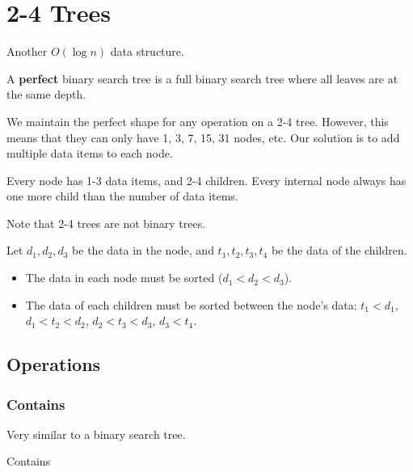 
\section{2-4 Trees}

Another \( O(\log n) \) data structure.
\begin{definition}
	A \textbf{perfect} binary search tree is a full binary search tree where all leaves are at the same depth.
\end{definition}

We maintain the perfect shape for any operation on a 2-4 tree. However, this means that they can only have 1, 3, 7, 15, 31 nodes, etc. Our solution is to add multiple data items to each node.

\begin{property}
	Every node has 1-3 data items, and 2-4 children. Every internal node always has one more child than the number of data items.
\end{property}

\begin{note}
	Note that 2-4 trees are not binary trees.
\end{note}

\begin{property}
	Let \( d_{1}, d_{2}, d_{3} \) be the data in the node, and \( t_{1}, t_{2}, t_{3}, t_{4} \) be the data of the children.
	\begin{itemize}
		\item The data in each node must be sorted (\( d_{1} < d_{2} < d_{3} \)).
		\item The data of each children must be sorted between the node's data: \( t_{1} < d_{1} \), \( d_{1} < t_{2} < d_{2} \), \( d_{2} < t_{3} < d_{3} \), \( d_{3} < t_{4} \).
	\end{itemize}
\end{property}

\subsection{Operations}

\subsubsection{Contains}
Very similar to a binary search tree.

\begin{algorithm}[H]
	\caption{Contains}
\end{algorithm}

